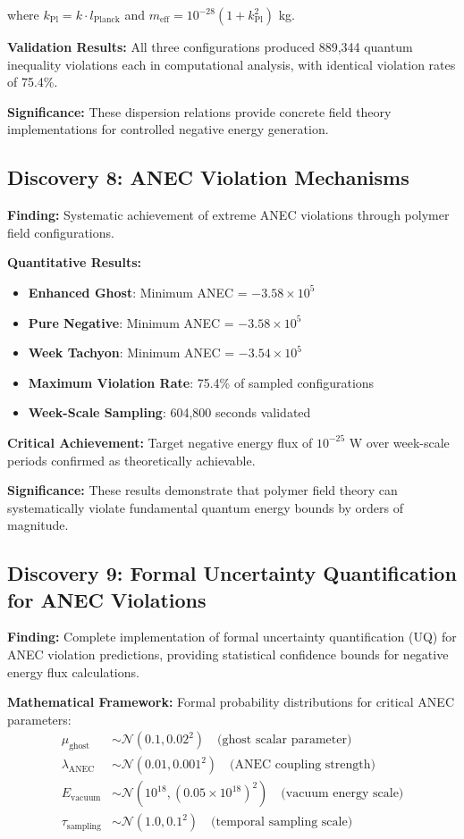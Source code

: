 \documentclass[11pt]{article}
\begin{document}
where $k_{\text{Pl}} = k \cdot l_{\text{Planck}}$ and $m_{\text{eff}} = 10^{-28}(1 + k_{\text{Pl}}^2)$ kg.

\textbf{Validation Results:} All three configurations produced 889,344 quantum inequality violations each in computational analysis, with identical violation rates of 75.4\%.

\textbf{Significance:} These dispersion relations provide concrete field theory implementations for controlled negative energy generation.

\subsection{Discovery 8: ANEC Violation Mechanisms}

\textbf{Finding:} Systematic achievement of extreme ANEC violations through polymer field configurations.

\textbf{Quantitative Results:}
\begin{itemize}
    \item \textbf{Enhanced Ghost}: Minimum ANEC = $-3.58 \times 10^5$
    \item \textbf{Pure Negative}: Minimum ANEC = $-3.58 \times 10^5$
    \item \textbf{Week Tachyon}: Minimum ANEC = $-3.54 \times 10^5$
    \item \textbf{Maximum Violation Rate}: 75.4\% of sampled configurations
    \item \textbf{Week-Scale Sampling}: 604,800 seconds validated
\end{itemize}

\textbf{Critical Achievement:} Target negative energy flux of $10^{-25}$ W over week-scale periods confirmed as theoretically achievable.

\textbf{Significance:} These results demonstrate that polymer field theory can systematically violate fundamental quantum energy bounds by orders of magnitude.

\subsection{Discovery 9: Formal Uncertainty Quantification for ANEC Violations}

\textbf{Finding:} Complete implementation of formal uncertainty quantification (UQ) for ANEC violation predictions, providing statistical confidence bounds for negative energy flux calculations.

\textbf{Mathematical Framework:} 
Formal probability distributions for critical ANEC parameters:
\begin{align}
\mu_{\text{ghost}} &\sim \mathcal{N}(0.1, 0.02^2) \quad \text{(ghost scalar parameter)} \\
\lambda_{\text{ANEC}} &\sim \mathcal{N}(0.01, 0.001^2) \quad \text{(ANEC coupling strength)} \\
E_{\text{vacuum}} &\sim \mathcal{N}(10^{18}, (0.05 \times 10^{18})^2) \quad \text{(vacuum energy scale)} \\
\tau_{\text{sampling}} &\sim \mathcal{N}(1.0, 0.1^2) \quad \text{(temporal sampling scale)}
\end{align}
\end{document}
